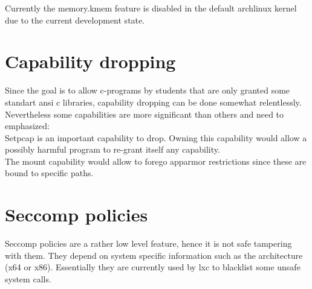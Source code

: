 Currently the memory.kmem feature is disabled in the default archlinux kernel due to the current development state.\cite{kmembug}

\section{Capability dropping}

Since the goal is to allow c-programs by students that are only granted some standart ansi c libraries, capability dropping can be
done somewhat relentlessly. Nevertheless some capabilities are more significant than others and need to emphasized:\\
Setpcap is an important capability to drop. Owning this capability would allow a possibly harmful program to re-grant itself any
capability.\cite{kernelcaps}\\
The mount capability would allow to forego apparmor restrictions since these are bound to specific paths.

\section{Seccomp policies}

Seccomp policies are a rather low level feature, hence it is not safe tampering with them. They depend on system specific information such
as the architecture (x64 or x86). Essentially they are currently used by lxc to blacklist some unsafe system calls.